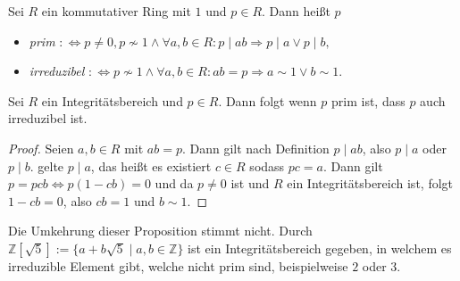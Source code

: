 \begin{definition}
    Sei $R$ ein kommutativer Ring mit $1$ und $p\in R$. Dann heißt $p$
    \begin{itemize}
        \item \emph{prim} $:\Leftrightarrow p\neq 0, p\not\sim 1\land \forall a,b\in R:p\mid ab\Rightarrow p\mid a\lor p\mid b,$
        \item \emph{irreduzibel} $:\Leftrightarrow p\not\sim 1\land \forall a,b\in R:ab=p\Rightarrow a\sim 1\lor b\sim 1.$
    \end{itemize}
\end{definition}

\begin{proposition}
    Sei $R$ ein Integritätsbereich und $p\in R$. Dann folgt wenn $p$ prim ist, dass $p$ auch irreduzibel ist.
\end{proposition}

\begin{proof}
    Seien $a,b\in R$ mit $ab=p$. Dann gilt nach Definition $p\mid ab$, also $p\mid a$ oder $p\mid b$.
    \obda gelte $p\mid a$, das heißt es existiert $c\in R$ sodass $pc=a$. Dann gilt $p=pcb\Leftrightarrow p(1-cb)=0$
    und da $p\neq 0$ ist und $R$ ein Integritätsbereich ist, folgt $1-cb=0$, also $cb=1$ und $b\sim 1$.
\end{proof}

\begin{example}
    Die Umkehrung dieser Proposition stimmt nicht.
    Durch $\mathbb{Z}[\sqrt{5}] := \{a+b\sqrt{5} \mid a,b \in \mathbb{Z}\}$ ist ein Integritätsbereich gegeben, in welchem es irreduzible Element
    gibt, welche nicht prim sind, beispielweise $2$ oder $3$.
\end{example}
